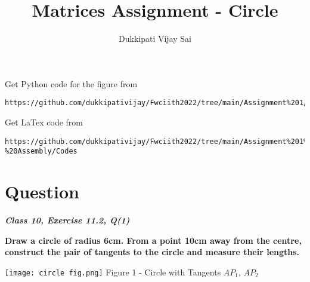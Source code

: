 \documentclass[journal,12pt,twocolumn]{IEEEtran}
\begin{document}
\makeatother
\let\StandardTheFigure\thefigure
\let\vec\mathbf
\renewcommand{\thefigure}{\theproblem}
\def\putbox#1#2#3{\makebox[0in][l]{\makebox[#1][l]{}\raisebox{\baselineskip}[0in][0in]{\raisebox{#2}[0in][0in]{#3}}}}
     \def\rightbox#1{\makebox[0in][r]{#1}}
     \def\centbox#1{\makebox[0in]{#1}}
     \def\topbox#1{\raisebox{-\baselineskip}[0in][0in]{#1}}
     \def\midbox#1{\raisebox{-0.5\baselineskip}[0in][0in]{#1}}
\vspace{3cm}
\title{\textbf{Matrices Assignment - Circle} }
\author{Dukkipati Vijay Sai}
\maketitle
\newpage
\bigskip
\renewcommand{\thefigure}{\theenumi}
\renewcommand{\thetable}{\theenumi}
Get Python code for the figure from 
\begin{lstlisting}
https://github.com/dukkipativijay/Fwciith2022/tree/main/Assignment%201/Codes/src
\end{lstlisting}
Get LaTex code from
\begin{lstlisting}
https://github.com/dukkipativijay/Fwciith2022/tree/main/Assignment%201%20-%20Assembly/Codes
\end{lstlisting}
%
\section{Question}
\centering
\textbf{\textit{Class 10, Exercise 11.2, Q(1)}}\\
\vspace{0.25cm}
\raggedright
\textbf{Draw a circle of radius 6cm. From a point 10cm away from the centre, construct the pair of tangents to the circle and measure their lengths.} \\
\raggedright
\texttt{[image: circle fig.png]}
Figure 1 - Circle with Tangents $AP_1$, $AP_2$
\end{document}
